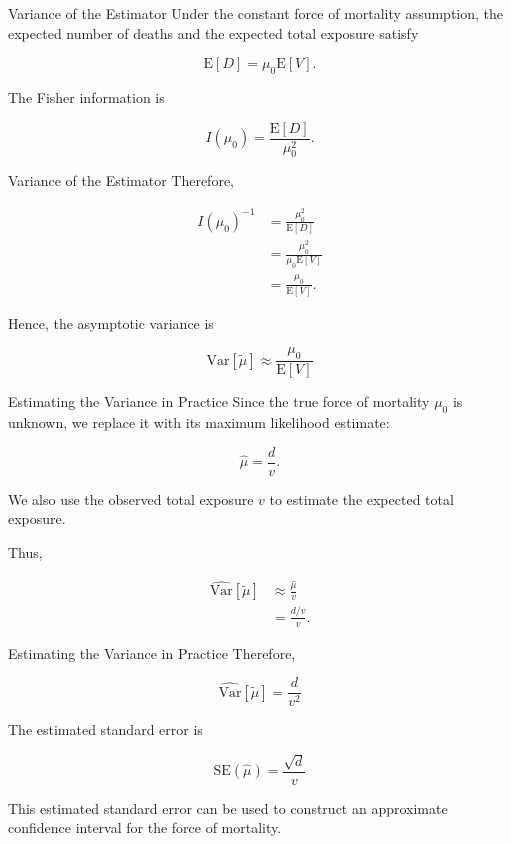 \documentclass[
  ignorenonframetext,
  aspectratio=169,
]{beamer}
\begin{document}
\begin{frame}{Variance of the Estimator}
\protect{}\label{variance-of-the-estimator}
Under the constant force of mortality assumption, the expected number of
deaths and the expected total exposure satisfy

\[
\mathrm{E}[D]=\mu_0\mathrm{E}[V].
\]

The Fisher information is

\[
I(\mu_0)=\frac{\mathrm{E}[D]}{\mu_0^2}.
\]
\end{frame}

\begin{frame}{Variance of the Estimator}
\protect{}\label{variance-of-the-estimator-1}
Therefore,

\[
\begin{aligned}
I(\mu_0)^{-1}
&=\frac{\mu_0^2}{\mathrm{E}[D]}\\
&=\frac{\mu_0^2}{\mu_0\mathrm{E}[V]}\\
&=\frac{\mu_0}{\mathrm{E}[V]}.
\end{aligned}
\]

Hence, the asymptotic variance is

\[
\boxed{
\mathrm{Var}[\tilde{\mu}]
\approx
\frac{\mu_0}{\mathrm{E}[V]}
}
\]
\end{frame}

\begin{frame}{Estimating the Variance in Practice}
\protect{}\label{estimating-the-variance-in-practice}
Since the true force of mortality \(\mu_0\) is unknown, we replace it
with its maximum likelihood estimate:

\[
\hat{\mu}=\frac{d}{v}.
\]

We also use the observed total exposure \(v\) to estimate the expected
total exposure.

Thus,

\[
\begin{aligned}
\widehat{\mathrm{Var}}[\tilde{\mu}]
&\approx \frac{\hat{\mu}}{v}\\
&=\frac{d/v}{v}.
\end{aligned}
\]
\end{frame}

\begin{frame}{Estimating the Variance in Practice}
\protect{}\label{estimating-the-variance-in-practice-1}
Therefore,

\[
\boxed{
\widehat{\mathrm{Var}}[\tilde{\mu}]
=\frac{d}{v^2}
}
\]

The estimated standard error is

\[
\boxed{
\mathrm{SE}(\hat{\mu})
=\frac{\sqrt{d}}{v}
}
\]

This estimated standard error can be used to construct an approximate
confidence interval for the force of mortality.
\end{frame}
\end{document}

